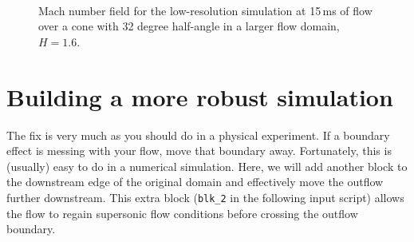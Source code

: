 \begin{figure}[htbp]
\begin{center}
\\
\end{center}
\caption{Mach number field for the low-resolution simulation at 15\,ms
         of flow over a cone with 32 degree half-angle
         in a larger flow domain, $H=1.6$.}
\label{conep-32-degrees-H-1p6-15ms-M-field-fig}
\end{figure}

      
\section{Building a more robust simulation}
%
The fix is very much as you should do in a physical experiment.
If a boundary effect is messing with your flow, move that boundary away.
Fortunately, this is (usually) easy to do in a numerical simulation.
Here, we will add another block to the downstream edge of the original domain and 
effectively move the outflow further downstream.
This extra block (\verb!blk_2! in the following input script) allows the flow 
to regain supersonic flow conditions before crossing the outflow boundary.

